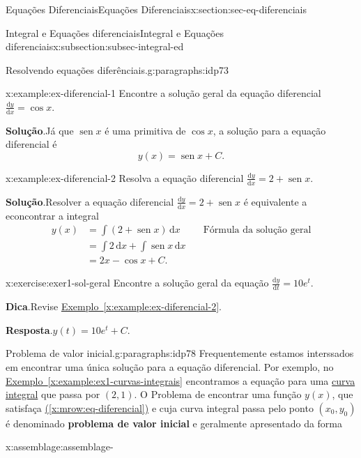 \documentclass[oneside,10pt,]{article}
\newcommand{\blocktitlefont}{\relax}
\newcommand{\xreffont}{\relax}
\newcommand{\terminology}[1]{\textbf{#1}}
\numberwithin{equation}{section}
\newcommand{\dd}{\mathrm{d}}
\newcommand{\integral}[2]{\displaystyle\int {#1}\,\dd {#2}}
\DeclareMathOperator{\sin}{sen}
\newcommand{\amp}{&}
\begin{document}
\begin{sectionptx}{Equações Diferenciais}{}{Equações Diferenciais}{}{}{x:section:sec-eq-diferenciais}
\begin{subsectionptx}{Integral e Equações diferenciais}{}{Integral e Equações diferenciais}{}{}{x:subsection:subsec-integral-ed}
\begin{paragraphs}{Resolvendo equações diferênciais.}{g:paragraphs:idp73}%
\begin{example}{}{x:example:ex-diferencial-1}%
Encontre a solução geral da equação diferencial  \(\frac{\dd y}{\dd x} = \cos{x}\).%
\par\smallskip%
\noindent\textbf{\blocktitlefont Solução}.\hypertarget{g:solution:idp74}{}\quad{}Já que \(\sin{x}\) é uma primitiva de \(\cos{x}\), a solução para a equação diferencial é%
\begin{equation*}
y(x) = \sin{x} + C.
\end{equation*}
%
\end{example}
\begin{example}{}{x:example:ex-diferencial-2}%
Resolva a equação diferencial \(\frac{\dd y}{\dd x} = 2 + \sin{x}\).%
\par\smallskip%
\noindent\textbf{\blocktitlefont Solução}.\hypertarget{g:solution:idp75}{}\quad{}Resolver a equação diferencial \(\frac{\dd y}{\dd x} = 2 + \sin{x}\) é equivalente a econcontrar a integral%
\begin{align*}
y(x) \amp = \integral{\left(2+ \sin{x}\right)}{x} \amp \quad \hyperref[x:assemblage:asse-sol-eq-diferencial]{\text{Fórmula da solução geral}} \\
\amp =\integral{2}{x} + \integral{\sin{x}}{x}\\
\amp = 2x -\cos{x} + C\text{.}
\end{align*}
%
\end{example}
\begin{inlineexercise}{}{x:exercise:exer1-sol-geral}%
Encontre a solução geral da equação \(\frac{\dd y}{\dd t}=10e^t\).%
\par\smallskip%
\noindent\textbf{\blocktitlefont Dica}.\hypertarget{g:hint:idp76}{}\quad{}Revise \hyperref[x:example:ex-diferencial-2]{Exemplo~{\xreffont\ref{x:example:ex-diferencial-2}}}.%
\par\smallskip%
\noindent\textbf{\blocktitlefont Resposta}.\hypertarget{g:answer:idp77}{}\quad{}\(y(t)= 10e^t + C\).%
\end{inlineexercise}%
\end{paragraphs}%
\begin{paragraphs}{Problema de valor inicial.}{g:paragraphs:idp78}%
Frequentemente estamos interssados em encontrar uma única solução para a  equação diferencial. Por exemplo, no \hyperref[x:example:ex1-curvas-integrais]{Exemplo~{\xreffont\ref{x:example:ex1-curvas-integrais}}} encontramos a equação para uma \hyperref[x:definition:curvas-integrais]{curva integral} que passa por \((2,1)\). O Problema de encontrar uma função    \(y(x)\), que satisfaça \hyperref[x:mrow:eq-diferencial]{({\xreffont\ref{x:mrow:eq-diferencial}})} e cuja curva integral passa pelo ponto \((x_0,y_0)\)  é denominado    \terminology{problema de valor inicial} e geralmente apresentado da forma \begin{assemblage}{}{x:assemblage:assemblage-}%

\end{assemblage}
\end{paragraphs}
\end{subsectionptx}
\end{sectionptx}
\end{document}

